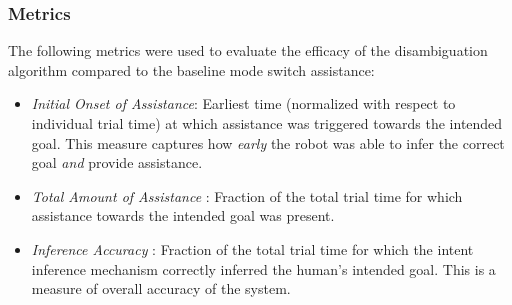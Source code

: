 \documentclass[conference]{IEEEtran}
\begin{document}
\subsubsection{Metrics}
The following metrics were used to evaluate the efficacy of the disambiguation algorithm compared to the baseline mode switch assistance:
\begin{itemize}
	\item \textit{Initial Onset of Assistance}: Earliest time (normalized with respect to individual trial time) at which assistance  was triggered towards the intended goal. This measure captures how \textit{early} the robot was able to infer the correct goal  \textit{and} provide assistance. 
	\item \textit{Total Amount of Assistance }: Fraction of the total trial time for which assistance towards the intended goal was present.  
	\item \textit{Inference Accuracy }: Fraction of the total trial time for which the intent inference mechanism correctly inferred the human's intended goal. This is a measure of overall accuracy of the system. 
\end{itemize}
\end{document}
